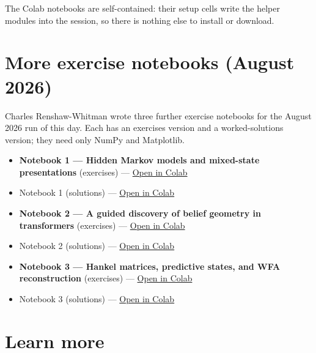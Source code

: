 \documentclass[11pt]{article}
\begin{document}
The Colab notebooks are self-contained: their setup cells write the helper
modules into the session, so there is nothing else to install or download.

\section{More exercise notebooks (August 2026)}\label{sec:crw-notebooks}

Charles Renshaw-Whitman wrote three further exercise notebooks for the August
2026 run of this day. Each has an exercises version and a worked-solutions
version; they need only NumPy and Matplotlib.

\begin{itemize}
\item
  \textbf{Notebook 1 --- Hidden Markov models and mixed-state presentations} (exercises) --- \href{https://colab.research.google.com/github/CharlesR-W/IliadIntensiveCompMechDay/blob/main/notebooks/01_hmms_msps_exercises.ipynb}{Open in Colab}
\item
  Notebook 1 (solutions) --- \href{https://colab.research.google.com/github/CharlesR-W/IliadIntensiveCompMechDay/blob/main/notebooks/01_hmms_msps_solutions.ipynb}{Open in Colab}
\item
  \textbf{Notebook 2 --- A guided discovery of belief geometry in transformers} (exercises) --- \href{https://colab.research.google.com/github/CharlesR-W/IliadIntensiveCompMechDay/blob/main/notebooks/02_transformer_belief_geometry_exercises.ipynb}{Open in Colab}
\item
  Notebook 2 (solutions) --- \href{https://colab.research.google.com/github/CharlesR-W/IliadIntensiveCompMechDay/blob/main/notebooks/02_transformer_belief_geometry_solutions.ipynb}{Open in Colab}
\item
  \textbf{Notebook 3 --- Hankel matrices, predictive states, and WFA reconstruction} (exercises) --- \href{https://colab.research.google.com/github/CharlesR-W/IliadIntensiveCompMechDay/blob/main/notebooks/03_hankel_psr_wfa_exercises.ipynb}{Open in Colab}
\item
  Notebook 3 (solutions) --- \href{https://colab.research.google.com/github/CharlesR-W/IliadIntensiveCompMechDay/blob/main/notebooks/03_hankel_psr_wfa_solutions.ipynb}{Open in Colab}
\end{itemize}

\section{Learn more}\label{learn-more}
\end{document}
